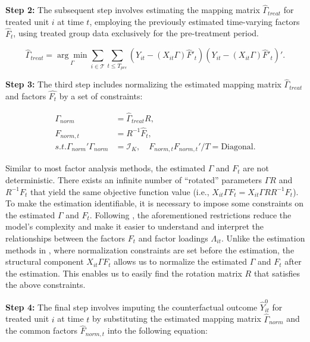\documentclass[12pt]{article}
\begin{document}
\textbf{Step 2:} The subsequent step involves estimating the mapping matrix $\hat{\Gamma}_{treat}$ for treated unit $i$ at time $t$, employing the previously estimated time-varying factors $\hat{F}_t$, using treated group data exclusively for the pre-treatment period.

\begin{equation}
\hat{\Gamma}_{treat} = \underset{\Gamma}{\arg\min} \sum_{i \in \mathcal{T}} \sum_{t \leq T_{pre}} \left( Y_{it} - (X_{it} \Gamma) \hat{F}'_{t} \right) \left( Y_{it} - (X_{it} \Gamma) \hat{F}'_{t} \right)'.
\end{equation}


\textbf{Step 3:} The third step includes normalizing the estimated mapping matrix $\hat{\Gamma}_{treat}$ and factors $\hat{F_t}$ by a set of constraints:

\begin{equation}
\label{eqn: normalization}
\begin{aligned}
\Gamma_{norm} &= \hat{\Gamma}_{treat} R, \\
F_{norm, t} &= R^{-1} \hat{F}_t, \\
s.t. \Gamma_{norm}'\Gamma_{norm} &= \mathcal{I}_K, \quad F_{norm, t} F_{norm, t}'/T = \text{Diagonal}.
\end{aligned}
\end{equation}

Similar to most factor analysis methods, the estimated $\Gamma$ and $F_t$ are not deterministic. There exists an infinite number of ``rotated'' parameters $\Gamma R$ and $R^{-1}F_t$ that yield the same objective function value (i.e., $X_{it} \Gamma F_t = X_{it} \Gamma R R^{-1} F_t$). To make the estimation identifiable, it is necessary to impose some constraints on the estimated $\Gamma$ and $F_t$. Following \cite{connor1993test, stock2002forecasting, bai2002determining}, the aforementioned restrictions reduce the model's complexity and make it easier to understand and interpret the relationships between the factors $F_t$ and factor loadings $\Lambda_{it}$. Unlike the estimation methods in \cite{bai2009panel,xu2017generalized}, where normalization constraints are set before the estimation, the structural component $X_{it} \Gamma F_t$ allows us to normalize the estimated $\Gamma$ and $F_t$ after the estimation. This enables us to easily find the rotation matrix $R$ that satisfies the above constraints.

\textbf{Step 4:} The final step involves imputing the counterfactual outcome $\hat{Y}_{it}^0$ for treated unit $i$ at time $t$ by substituting the estimated mapping matrix $\hat{\Gamma}_{norm}$ and the common factors $\hat{F}_{norm, t}$ into the following equation:
\end{document}
